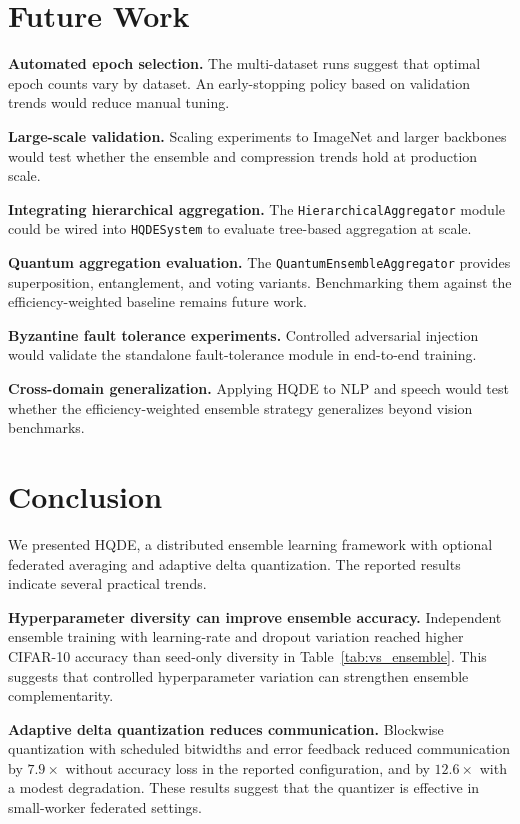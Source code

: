 \documentclass[journal,twoside]{IEEEtran}
\newcommand{\hqde}{\mbox{HQDE}\xspace}
\begin{document}
\section{Future Work}
\label{sec:future}

\textbf{Automated epoch selection.} The multi-dataset runs suggest that
optimal epoch counts vary by dataset. An early-stopping policy based on
validation trends would reduce manual tuning.

\textbf{Large-scale validation.} Scaling experiments to ImageNet and
larger backbones would test whether the ensemble and compression trends
hold at production scale.

\textbf{Integrating hierarchical aggregation.} The
\texttt{HierarchicalAggregator} module could be wired into
\texttt{HQDESystem} to evaluate tree-based aggregation at scale.

\textbf{Quantum aggregation evaluation.} The
\texttt{QuantumEnsembleAggregator} provides superposition, entanglement,
and voting variants. Benchmarking them against the efficiency-weighted
baseline remains future work.

\textbf{Byzantine fault tolerance experiments.} Controlled adversarial
injection would validate the standalone fault-tolerance module in
end-to-end training.

\textbf{Cross-domain generalization.} Applying \hqde{} to NLP and speech
would test whether the efficiency-weighted ensemble strategy generalizes
beyond vision benchmarks.

\section{Conclusion}
\label{sec:conc}

We presented \hqde{}, a distributed ensemble learning framework with
optional federated averaging and adaptive delta quantization. The
reported results indicate several practical trends.

\textbf{Hyperparameter diversity can improve ensemble accuracy.}
Independent ensemble training with learning-rate and dropout variation
reached higher CIFAR-10 accuracy than seed-only diversity in
Table~\ref{tab:vs_ensemble}.
This suggests that controlled hyperparameter variation can strengthen
ensemble complementarity.

\textbf{Adaptive delta quantization reduces communication.} Blockwise
quantization with scheduled bitwidths and error feedback reduced
communication by $7.9\times$ without accuracy loss in the reported
configuration, and by $12.6\times$ with a modest degradation. These
results suggest that the quantizer is effective in small-worker
federated settings.
\end{document}
